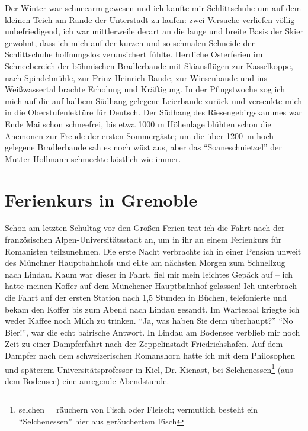Der Winter war schneearm gewesen und ich kaufte mir Schlittschuhe um auf dem kleinen Teich am Rande der Unterstadt zu laufen: zwei Versuche verliefen völlig unbefriedigend, ich war mittlerweile derart an die lange und breite Basis der Skier gewöhnt, dass ich mich auf der kurzen und so schmalen Schneide der Schlittschuhe hoffnungslos verunsichert fühlte. Herrliche Osterferien im Schneebereich der böhmischen Bradlerbaude mit Skiausflügen zur Kasselkoppe, nach Spindelmühle, zur Prinz-Heinrich-Baude, zur Wiesenbaude und ins Weißwassertal brachte Erholung und Kräftigung. In der Pfingstwoche zog ich mich auf die auf halbem Südhang gelegene Leierbaude zurück und versenkte mich in die Oberstufenlektüre für Deutsch. Der Südhang des Riesengebirgskammes war Ende Mai schon schneefrei, bis etwa \num{1000} m Höhenlage blühten schon die Anemonen zur Freude der ersten Sommergäste; um die über 1200~m hoch gelegene Bradlerbaude sah es noch wüst aus, aber das \enquote{Soaneschnietzel} der Mutter Hollmann schmeckte köstlich wie immer.

\section{Ferienkurs in Grenoble}
Schon am letzten Schultag vor den Großen Ferien trat ich die Fahrt nach der französischen Alpen-Universitätsstadt an, um in ihr an einem Ferienkurs für Romanisten teilzunehmen. Die erste Nacht verbrachte ich in einer Pension unweit des Münchner Hauptbahnhofs und eilte am nächsten Morgen zum Schnellzug nach Lindau. Kaum war dieser in Fahrt, fiel mir mein leichtes Gepäck auf -- ich hatte meinen Koffer auf dem Münchener Hauptbahnhof gelassen! Ich unterbrach die Fahrt auf der ersten Station nach 1,5 Stunden in Büchen, telefonierte und bekam den Koffer bis zum Abend nach Lindau gesandt. Im Wartesaal kriegte ich weder Kaffee noch Milch zu trinken. \enquote{Ja, was haben Sie denn überhaupt?} \enquote{No Bier!}, war die echt bairische Antwort. In Lindau am Bodensee verblieb mir noch Zeit zu einer Dampferfahrt nach der Zeppelinstadt Friedrichshafen. Auf dem Dampfer nach dem schweizerischen Romanshorn hatte ich mit dem Philosophen und späterem Universitätsprofessor in Kiel, Dr. Kienast, bei Selchenessen\footnote{selchen = räuchern von Fisch oder Fleisch; vermutlich besteht ein \enquote{Selchenessen} hier aus geräuchertem Fisch} (aus dem Bodensee) eine anregende Abendstunde.

